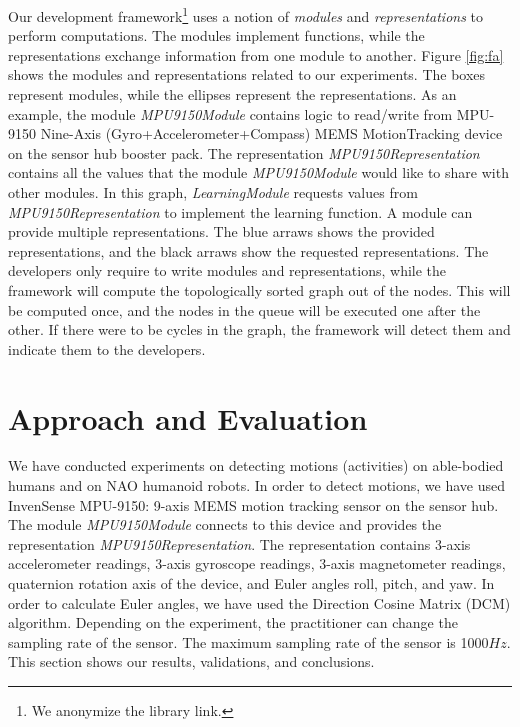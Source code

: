 \documentclass[letterpaper]{article}
\begin{document}
Our development framework\footnote{We anonymize the library link.} uses a notion of 
{\em modules} and {\em representations} to perform
computations. The modules implement functions, while the representations exchange information from
one module to another. Figure \ref{fig:fa} shows the modules and representations related to our 
experiments. The boxes represent modules, while the ellipses represent the representations. As an
example, the module {\em MPU9150Module} contains logic to read/write from MPU-9150 Nine-Axis
(Gyro+Accelerometer+Compass) MEMS MotionTracking device on the sensor hub booster
pack. The representation {\em MPU9150Representation} contains all the values that the module
{\em MPU9150Module} would like to share with other modules. In this graph, {\em LearningModule}
requests values from {\em MPU9150Representation} to implement the learning function. A module can 
provide multiple representations. The blue arraws shows the provided representations, and the black 
arraws show the requested representations. The developers only require to write 
modules and representations, while the framework will compute the topologically sorted graph out of 
the nodes. This will be computed once, and the nodes in the queue will be executed one after the 
other. If there were to be cycles in the graph, the framework will detect them and indicate them to 
the developers.


\section{Approach and Evaluation}

We have conducted experiments on detecting motions (activities) on able-bodied humans and on NAO
humanoid robots. In order to detect motions, we have used InvenSense MPU-9150: 9-axis MEMS
motion tracking sensor on the sensor hub. The module {\em MPU9150Module} connects to this device
and provides the representation {\em MPU9150Representation}. The representation contains
3-axis accelerometer readings, 3-axis gyroscope readings, 3-axis magnetometer readings, quaternion
rotation axis of the device, and Euler angles roll, pitch, and yaw.  In order to calculate Euler
angles, we have used the Direction Cosine Matrix (DCM)
algorithm.  Depending on the
experiment, the practitioner can change the sampling rate of the sensor.  The maximum sampling rate
of the sensor is 1000$Hz$. This section shows our results, validations, and conclusions.
\end{document}
